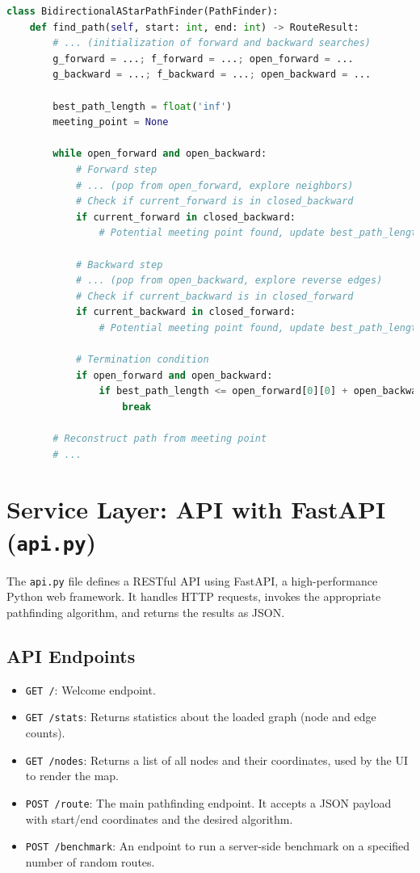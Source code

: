 \documentclass[12pt, a4paper]{report}
\begin{document}
\begin{lstlisting}[language=Python, caption={Code Snippet: `BidirectionalAStarPathFinder' from `algorithms.py'}, label={lst:bidir_astar}]
class BidirectionalAStarPathFinder(PathFinder):
    def find_path(self, start: int, end: int) -> RouteResult:
        # ... (initialization of forward and backward searches)
        g_forward = ...; f_forward = ...; open_forward = ...
        g_backward = ...; f_backward = ...; open_backward = ...

        best_path_length = float('inf')
        meeting_point = None

        while open_forward and open_backward:
            # Forward step
            # ... (pop from open_forward, explore neighbors)
            # Check if current_forward is in closed_backward
            if current_forward in closed_backward:
                # Potential meeting point found, update best_path_length

            # Backward step
            # ... (pop from open_backward, explore reverse edges)
            # Check if current_backward is in closed_forward
            if current_backward in closed_forward:
                # Potential meeting point found, update best_path_length
            
            # Termination condition
            if open_forward and open_backward:
                if best_path_length <= open_forward[0][0] + open_backward[0][0]:
                    break
        
        # Reconstruct path from meeting point
        # ...
\end{lstlisting}

\section{Service Layer: API with FastAPI (\texttt{api.py})}

The \texttt{api.py} file defines a RESTful API using FastAPI, a high-performance Python web framework. It handles HTTP requests, invokes the appropriate pathfinding algorithm, and returns the results as JSON.

\subsection{API Endpoints}
\begin{itemize}
    \item \texttt{GET /}: Welcome endpoint.
    \item \texttt{GET /stats}: Returns statistics about the loaded graph (node and edge counts).
    \item \texttt{GET /nodes}: Returns a list of all nodes and their coordinates, used by the UI to render the map.
    \item \texttt{POST /route}: The main pathfinding endpoint. It accepts a JSON payload with start/end coordinates and the desired algorithm.
    \item \texttt{POST /benchmark}: An endpoint to run a server-side benchmark on a specified number of random routes.
\end{itemize}
\end{document}

